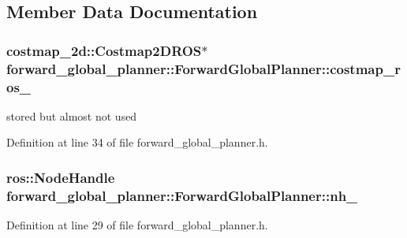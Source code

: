\subsection{Member Data Documentation}
\subsubsection[{\texorpdfstring{costmap\+\_\+ros\+\_\+}{costmap_ros_}}]{\setlength{\rightskip}{0pt plus 5cm}costmap\+\_\+2d\+::\+Costmap2\+D\+R\+OS$\ast$ forward\+\_\+global\+\_\+planner\+::\+Forward\+Global\+Planner\+::costmap\+\_\+ros\+\_\+\hspace{0.3cm}{\ttfamily [private]}}\hypertarget{classforward__global__planner_1_1ForwardGlobalPlanner_a2c11785b3c88fcec54e45ae1aadc0df7}{}\label{classforward__global__planner_1_1ForwardGlobalPlanner_a2c11785b3c88fcec54e45ae1aadc0df7}


stored but almost not used 



Definition at line 34 of file forward\+\_\+global\+\_\+planner.\+h.

\subsubsection[{\texorpdfstring{nh\+\_\+}{nh_}}]{\setlength{\rightskip}{0pt plus 5cm}ros\+::\+Node\+Handle forward\+\_\+global\+\_\+planner\+::\+Forward\+Global\+Planner\+::nh\+\_\+\hspace{0.3cm}{\ttfamily [private]}}\hypertarget{classforward__global__planner_1_1ForwardGlobalPlanner_aa2cafac2fc299721d52b3df7bddcd562}{}\label{classforward__global__planner_1_1ForwardGlobalPlanner_aa2cafac2fc299721d52b3df7bddcd562}


Definition at line 29 of file forward\+\_\+global\+\_\+planner.\+h.



